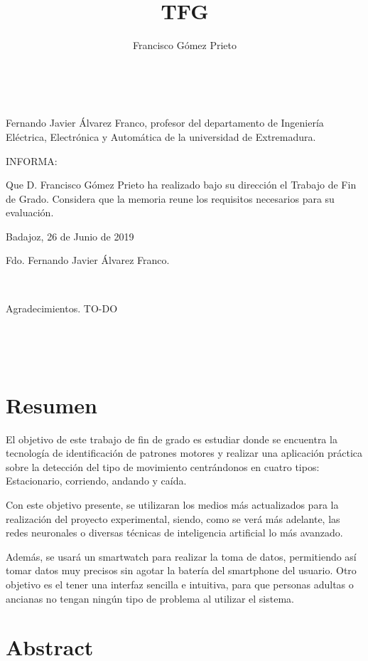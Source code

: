\documentclass[12pt]{article}
\title{TFG}
\author{Francisco Gómez Prieto}
\date{}
\numberwithin{equation}{section}
\begin{document}
\pagestyle{empty}
\lstset{language=Java}


\newpage
~

\newpage
Fernando Javier Álvarez Franco, profesor del departamento de Ingeniería Eléctrica, Electrónica y Automática de la universidad de Extremadura.

INFORMA:

Que D. Francisco Gómez Prieto ha realizado bajo su dirección el Trabajo de Fin de Grado. Considera que la memoria reune los requisitos necesarios para su evaluación.

\medskip

\begin{flushright}
Badajoz, 26 de Junio de 2019
\end{flushright}

\vspace{8\baselineskip}
\begin{center}
Fdo. Fernando Javier Álvarez Franco.
\end{center}
\newpage
~
\newpage

Agradecimientos. TO-DO

\newpage
~
\newpage
\setcounter{page}{1}
\pagestyle{plain}
\tableofcontents

\newpage
~

\newpage
\section*{Resumen}
El objetivo de este trabajo de fin de grado es estudiar donde se encuentra la tecnología de identificación de patrones motores y realizar una aplicación práctica sobre la detección del tipo de movimiento centrándonos en cuatro tipos: Estacionario, corriendo, andando y caída.

Con este objetivo presente, se utilizaran los medios más actualizados para la realización del proyecto experimental, siendo, como se verá más adelante, las redes neuronales o diversas técnicas de inteligencia artificial lo más avanzado. 

Además, se usará un smartwatch para realizar la toma de datos, permitiendo así tomar datos muy precisos sin agotar la batería del smartphone del usuario. Otro objetivo es el tener una interfaz sencilla e intuitiva, para que personas adultas o ancianas no tengan ningún tipo de problema al utilizar el sistema.


\newpage
\section*{Abstract}
\end{document}
